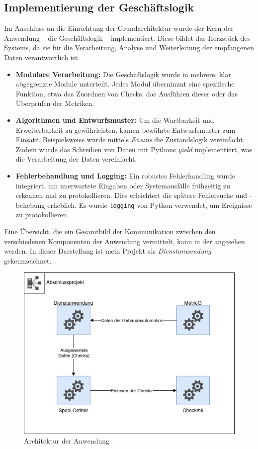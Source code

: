 \subsection{Implementierung der Geschäftslogik}
Im Anschluss an die Einrichtung der Grundarchitektur wurde der Kern der Anwendung – die Geschäftslogik – implementiert.
Diese bildet das Herzstück des Systems, da sie für die Verarbeitung, Analyse und Weiterleitung der empfangenen Daten verantwortlich ist.

\begin{itemize}
  \item \textbf{Modulare Verarbeitung:} Die Geschäftslogik wurde in mehrere, klar abgegrenzte Module unterteilt.
    Jedes Modul übernimmt eine spezifische Funktion, etwa das Zuordnen von Checks, das Ausführen dieser oder das Überprüfen der Metriken.
  \item \textbf{Algorithmen und Entwurfsmuster:} Um die Wartbarkeit und Erweiterbarkeit zu gewährleisten, kamen bewährte Entwurfsmuster zum Einsatz.
    Beispielsweise wurde mittels \textit{Enums} die Zustandslogik vereinfacht.
    Zudem wurde das Schreiben von Daten mit Pythons \textit{yield} implementiert, was die Verarbeitung der Daten vereinfacht.
  \item \textbf{Fehlerbehandlung und Logging:} Ein robustes Fehlerhandling wurde integriert, um unerwartete Eingaben oder Systemausfälle frühzeitig zu erkennen und zu protokollieren.
    Dies erleichtert die spätere Fehlersuche und -behebung erheblich.
    Es wurde \texttt{logging} von Python verwendet, um Ereignisse zu protokollieren.
\end{itemize}

\noindent
Eine Übersicht, die ein Gesamtbild der Kommunikation zwischen den verschiedenen Komponenten der Anwendung vermittelt, kann in der  angesehen werden.
In dieser Darstellung ist mein Projekt als \textit{Dienstanwendung} gekennzeichnet.

\begin{figure}[H]
  \centering
  \includegraphics[width=.6\textwidth]{images/architecture.png}
  \caption{Architektur der Anwendung}
  \label{fig:architecture}
\end{figure}

